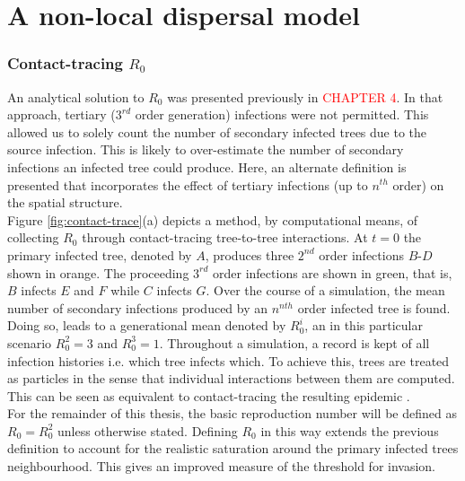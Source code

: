\chapter{A non-local dispersal model}
\label{ch5:dispersal-model}

\subsection{Contact-tracing $R_0$}

An analytical solution to $R_0$ was presented previously in \textcolor{red}{CHAPTER 4}. %
In that approach, tertiary ($3^{rd}$ order generation) infections were not permitted. %
This allowed us to solely count the number of secondary infected trees due to the source infection. %
This is likely to over-estimate the number of secondary infections an infected tree could produce. %
Here, an alternate definition is presented that incorporates the effect of tertiary infections %
(up to $n^{th}$ order)  on the spatial structure.\\

Figure \ref{fig:contact-trace}(a) depicts a method, by computational means, of collecting $R_0$ %
through contact-tracing tree-to-tree interactions. %
At $t=0$ the primary infected tree, denoted by $A$, produces three $2^{nd}$ order infections %
$B$-$D$ shown in orange. %
The proceeding $3^{rd}$ order infections are shown in green, that is, $B$ infects $E$ and $F$ while $C$ infects $G$. %
Over the course of a simulation, the mean number of secondary infections produced by an $n^{nth}$ order infected tree is found. %
Doing so, leads to a generational mean denoted by $R^i_0$, an in this particular scenario $R^2_0=3$ and $R^3_0=1$. 
Throughout a simulation, a record is kept of all infection histories i.e. which tree infects which. 
To achieve this, trees are treated as particles in the sense that individual interactions between them are computed. 
This can be seen as equivalent to contact-tracing the resulting epidemic \cite{eames2003contact}. \\

For the remainder of this thesis, the basic reproduction number will be defined as $R_0=R^2_0$ unless otherwise stated. 
Defining $R_0$ in this way extends the previous definition to account for the realistic %
saturation around the primary infected trees neighbourhood. This gives an improved measure %
of the threshold for invasion.\\

